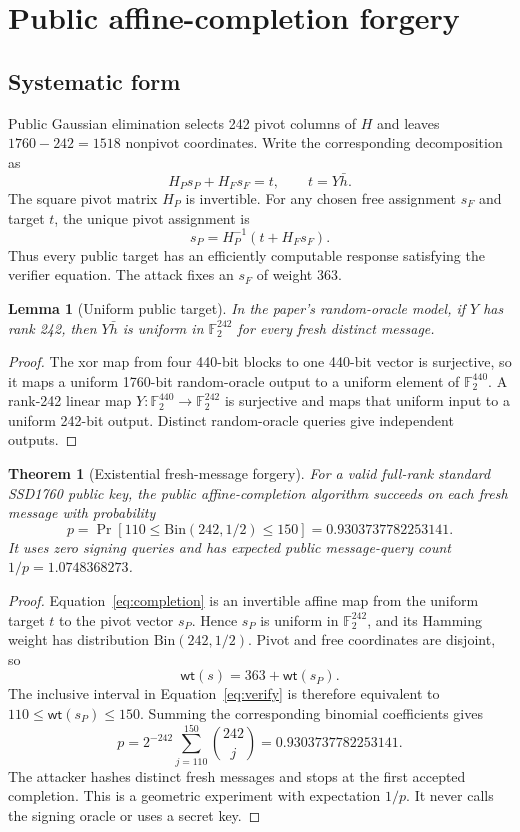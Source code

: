 \documentclass[10pt,a4paper]{article}
\newtheorem{theorem}{Theorem}
\newtheorem{lemma}{Lemma}
\newcommand{\F}{\mathbb{F}}
\newcommand{\wt}{\mathsf{wt}}
\begin{document}
\section{Public affine-completion forgery}

\subsection{Systematic form}

Public Gaussian elimination selects 242 pivot columns of $H$ and leaves
$1760-242=1518$ nonpivot coordinates. Write the corresponding decomposition
as
\[
 H_Ps_P+H_Fs_F=t,
 \qquad t=Y\bar h.
\]
The square pivot matrix $H_P$ is invertible. For any chosen free assignment
$s_F$ and target $t$, the unique pivot assignment is
\begin{equation}
 s_P=H_P^{-1}(t+H_Fs_F).
 \label{eq:completion}
\end{equation}
Thus every public target has an efficiently computable response satisfying
the verifier equation. The attack fixes an $s_F$ of weight 363.

\begin{lemma}[Uniform public target]
In the paper's random-oracle model, if $Y$ has rank 242, then $Y\bar h$ is
uniform in $\F_2^{242}$ for every fresh distinct message.
\end{lemma}

\begin{proof}
The xor map from four 440-bit blocks to one 440-bit vector is surjective, so it
maps a uniform 1760-bit random-oracle output to a uniform element of
$\F_2^{440}$. A rank-242 linear map $Y:\F_2^{440}\rightarrow\F_2^{242}$ is
surjective and maps that uniform input to a uniform 242-bit output. Distinct
random-oracle queries give independent outputs.
\end{proof}

\begin{theorem}[Existential fresh-message forgery]
For a valid full-rank standard SSD1760 public key, the public affine-completion
algorithm succeeds on each fresh message with probability
\[
 p=\Pr[110\leq\mathrm{Bin}(242,1/2)\leq150]
  =0.9303737782253141.
\]
It uses zero signing queries and has expected public message-query count
$1/p=1.0748368273$.
\end{theorem}

\begin{proof}
Equation~\eqref{eq:completion} is an invertible affine map from the uniform
target $t$ to the pivot vector $s_P$. Hence $s_P$ is uniform in
$\F_2^{242}$, and its Hamming weight has distribution
$\mathrm{Bin}(242,1/2)$. Pivot and free coordinates are disjoint, so
\[
 \wt(s)=363+\wt(s_P).
\]
The inclusive interval in Equation~\eqref{eq:verify} is therefore equivalent
to $110\leq\wt(s_P)\leq150$. Summing the corresponding binomial coefficients
gives
\[
 p=2^{-242}\sum_{j=110}^{150}\binom{242}{j}
  =0.9303737782253141.
\]
The attacker hashes distinct fresh messages and stops at the first accepted
completion. This is a geometric experiment with expectation $1/p$. It never
calls the signing oracle or uses a secret key.
\end{proof}
\end{document}
